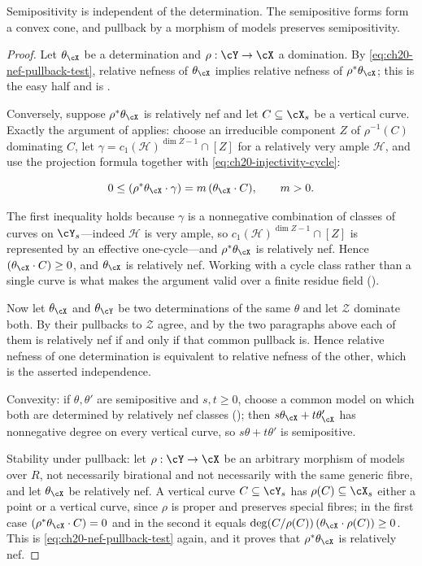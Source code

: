 \begin{proposition}\label{prop:ch20-semipositive-well-defined}
Semipositivity is independent of the determination.  The semipositive forms
form a convex cone, and pullback by a morphism of models preserves
semipositivity.
\end{proposition}

\begin{proof}
Let $\theta_{\cX}$ be a determination and $\rho:\cY\to\cX$ a
domination.  By \eqref{eq:ch20-nef-pullback-test}, relative nefness of
$\theta_{\cX}$ implies relative nefness of $\rho^*\theta_{\cX}$; this is
the easy half and is .

Conversely, suppose $\rho^*\theta_{\cX}$ is relatively nef and let
$C\subseteq\cX_s$ be a vertical curve.  Exactly the argument of
 applies: choose an irreducible component
$Z$ of $\rho^{-1}(C)$ dominating $C$, let
$\gamma=c_1(\mathcal H)^{\dim Z-1}\cap[Z]$ for a relatively very ample
$\mathcal H$, and use the projection formula together with
\eqref{eq:ch20-injectivity-cycle}:

\[
 0\leq(\rho^*\theta_{\cX}\cdot\gamma)=m\,(\theta_{\cX}\cdot C),
 \qquad m>0 .
\]

The first inequality holds because $\gamma$ is a nonnegative combination of
classes of curves on $\cY_s$---indeed $\mathcal H$ is very ample, so
$c_1(\mathcal H)^{\dim Z-1}\cap[Z]$ is represented by an effective
one-cycle---and $\rho^*\theta_{\cX}$ is relatively nef.  Hence
$(\theta_{\cX}\cdot C)\geq0$, and $\theta_{\cX}$ is relatively nef.
Working with a cycle class rather than a single curve is what makes the
argument valid over a finite residue field
().

Now let $\theta_{\cX}$ and $\theta_{\cY}$ be two determinations of the
same $\theta$ and let $\mathcal Z$ dominate both.  By
 their pullbacks to $\mathcal Z$ agree, and
by the two paragraphs above each of them is relatively nef if and only if
that common pullback is.  Hence relative nefness of one determination is
equivalent to relative nefness of the other, which is the asserted
independence.

Convexity: if $\theta,\theta'$ are semipositive and $s,t\geq0$, choose a
common model on which both are determined by relatively nef classes
(); then
$s\theta_{\cX}+t\theta'_{\cX}$ has nonnegative degree on every vertical
curve, so $s\theta+t\theta'$ is semipositive.

Stability under pullback: let $\rho:\cY\to\cX$ be an arbitrary morphism of
models over $R$, not necessarily birational and not necessarily with the
same generic fibre, and let $\theta_{\cX}$ be relatively nef.  A vertical
curve $C\subseteq\cY_s$ has $\rho(C)\subseteq\cX_s$ either a point or a
vertical curve, since $\rho$ is proper and preserves special fibres; in
the first case $(\rho^*\theta_{\cX}\cdot C)=0$ and in the second it equals
$\deg(C/\rho(C))\,(\theta_{\cX}\cdot\rho(C))\geq0$.  This is
\eqref{eq:ch20-nef-pullback-test} again, and it proves that
$\rho^*\theta_{\cX}$ is relatively nef.
\end{proof}

